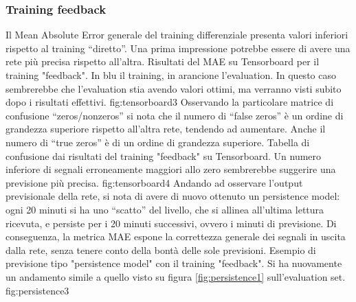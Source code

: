 \subsubsection{Training feedback}
Il Mean Absolute Error generale del training differenziale presenta valori inferiori rispetto al training “diretto”. Una prima impressione potrebbe essere di avere una rete più precisa rispetto all’altra.
{Risultati del MAE su Tensorboard per il training "feedback". In blu il training, in arancione l'evaluation. In questo caso sembrerebbe che l'evaluation stia avendo valori ottimi, ma verranno visti subito dopo i risultati effettivi.} 
{fig:tensorboard3}
Osservando la particolare matrice di confusione “zeros/nonzeros” si nota che il numero di “false zeros” è un ordine di grandezza superiore rispetto all’altra rete, tendendo ad aumentare. Anche il numero di “true zeros” è di un ordine di grandezza superiore.
{Tabella di confusione dai risultati del training "feedback" su Tensorboard. Un numero inferiore di segnali erroneamente maggiori allo zero sembrerebbe suggerire una previsione più precisa. } 
{fig:tensorboard4}
Andando ad osservare l’output previsionale della rete, si nota di avere di nuovo ottenuto un persistence model: ogni 20 minuti si ha uno “scatto” del livello, che si allinea all’ultima lettura ricevuta, e persiste per i 20 minuti successivi, ovvero i minuti di previsione. Di conseguenza, la metrica MAE espone la correttezza generale dei segnali in uscita dalla rete, senza tenere conto della bontà delle sole previsioni.
{Esempio di previsione tipo "persistence model" con il training "feedback". Si ha nuovamente un andamento simile a quello visto su figura \ref{fig:persistence1} sull'evaluation set.} 
{fig:persistence3}